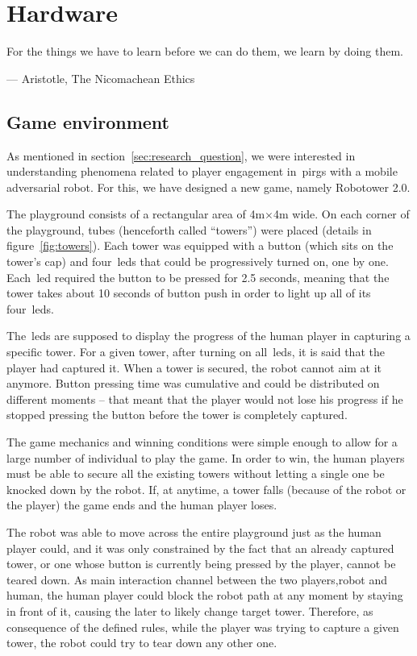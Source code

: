 \chapter{Hardware}\label{ch:foundation}
\epigraph{For the things we have to learn before we can do them, we learn by doing them.}{--- Aristotle, The Nicomachean Ethics}
\section{Game environment}\label{sec:game_environment}
As mentioned in section~\ref{sec:research_question}, we were interested in understanding phenomena related to player engagement in~\gls{pirg}s with a mobile adversarial robot. For this, we have designed a new game, namely Robotower 2.0.

The playground consists of a rectangular area of 4m$\times$4m wide. On each corner of the playground, tubes (henceforth called ``towers'') were placed (details in figure~\ref{fig:towers}). Each tower was equipped with a button (which sits on the tower's cap) and four~\gls{led}s that could be progressively turned on, one by one.  Each~\gls{led} required the button to be pressed for 2.5 seconds, meaning that the tower takes about 10 seconds of button push in order to light up all of its four~\gls{led}s.

The~\gls{led}s are supposed to display the progress of the human player in capturing a specific tower. For a given tower, after turning on all~\gls{led}s, it is said that the player had captured it. When a tower is secured, the robot cannot aim at it anymore.
Button pressing time was cumulative and could be distributed on different moments -- that meant that the player would not lose his progress if he stopped pressing the button before the tower is completely captured. 

The game mechanics and winning conditions were simple enough to allow for a large number of individual to play the game. In order to win, the human players must be able to secure all the existing towers without letting a single one be knocked down by the robot. If, at anytime, a tower falls (because of the robot or the player) the game ends and the human player loses. 

The robot was able to move across the entire playground just as the human player could, and it was only constrained by the fact that an already captured tower, or one whose button is currently being pressed by the player, cannot be teared down. As main interaction channel between the two players,\ie robot and human, the human player could block the robot path at any moment by staying in front of it, causing the later to likely change target tower. Therefore, as consequence of the defined rules, while the player was trying to capture a given tower, the robot could try to tear down any other one.

